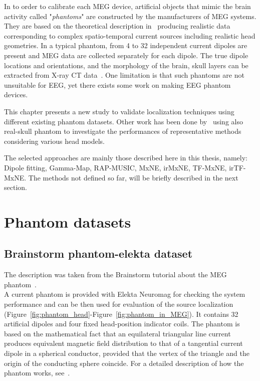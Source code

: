 In to order to calibrate each MEG device, artificial objects that mimic the brain activity called "\textit{phantoms}" are constructed by the manufacturers of MEG systems.
They are based on the theoretical description in~\cite{ilmoniemi1985forward} producing realistic data corresponding to complex spatio-temporal current sources including realistic head geometries. In a typical phantom, from 4 to 32 independent current dipoles are present and MEG data are collected separately for each dipole. The true dipole locations and orientations, and the morphology of the brain, skull layers can be extracted from X-ray CT data~\cite{leahy1998study}. One limitation is that such phantoms are not unsuitable for EEG, yet there exists some work on making EEG phantom devices.

This chapter presents a new study to validate localization techniques using different existing phantom datasets. Other work has been done by~\cite{hazim2015magnetoencephalography,leahy1998study,baillet2001evaluation} using also real-skull phantom to investigate the performances of representative methods considering various head models.

The selected approaches are mainly those described here in this thesis, namely: Dipole fitting, Gamma-Map, RAP-MUSIC, MxNE, irMxNE, TF-MxNE, irTF-MxNE. The methods not defined so far, will be briefly described in the next section.

\section{Phantom datasets}
\subsection{Brainstorm phantom-elekta dataset}
The description was taken from the Brainstorm tutorial about the MEG phantom~\cite{tadel2011brainstorm}.\\

A current phantom is provided with Elekta Neuromag for checking the system performance and can be then used for evaluation of the source localization (Figure~\ref{fig:phantom_head}-Figure~\ref{fig:phantom_in_MEG}). It contains 32 artificial dipoles and four fixed head-position indicator coils. The phantom is based on the mathematical fact that an equilateral triangular line current produces equivalent magnetic field distribution to that of a tangential current dipole in a spherical conductor, provided that the vertex of the triangle and the origin of the conducting sphere coincide. For a detailed description of how the phantom works, see~\cite{ilmoniemi1985forward}.\\
\\

